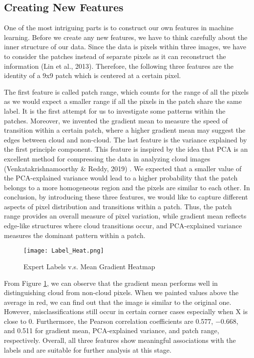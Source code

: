 \documentclass[10pt,letterpaper]{article}
\begin{document}
\subsection{Creating New Features}

One of the most intriguing parts is to construct our own features in machine learning. Before we create any new features, we have to think carefully about the inner structure of our data. Since the data is pixels within three images, we have to consider the patches instead of separate pixels as it can reconstruct the information \cite{lin2013patch} (Lin et al., 2013). Therefore, the following three features are the identity of a 9x9 patch which is centered at a certain pixel. 

The first feature is called patch range, which counts for the range of all the pixels as we would expect a smaller range if all the pixels in the patch share the same label. It is the first attempt for us to investigate some patterns within the patches. Moreover, we invented the gradient mean to measure the speed of transition within a certain patch, where a higher gradient mean may suggest the edges between cloud and non-cloud. The last feature is the variance explained by the first principle component. This feature is inspired by the idea that PCA is an excellent method for compressing the data in analyzing cloud images \cite{venkatakrishnamoorthy2019cloud} (Venkatakrishnamoorthy \& Reddy, 2019) . We expected that a smaller value of the PCA-explained variance would lead to a higher probability that the patch belongs to a more homogeneous region and the pixels are similar to each other. In conclusion, by introducing these three features, we would like to capture different aspects of pixel distribution and transitions within a patch. Thus, the patch range provides an overall measure of pixel variation, while gradient mean reflects edge-like structures where cloud transitions occur, and PCA-explained variance measures the dominant pattern within a patch.


\begin{figure}[htbp]
    \centering
    \texttt{[image: Label\_Heat.png]}
    \caption{Expert Labels v.s. Mean Gradient Heatmap}
    \label{fig:label_heat}
\end{figure}

From Figure \ref{fig:label_heat}, we can observe that the gradient mean performs well in distinguishing cloud from non-cloud pixels. When we painted values above the average in red, we can find out that the image is similar to the original one. However, misclassifications still occur in certain corner cases especially when X is close to 0. Furthermore, the Pearson correlation coefficients are 0.577, $-0.668$, and 0.511 for gradient mean, PCA-explained variance, and patch range, respectively. Overall, all three features show meaningful associations with the labels and are suitable for further analysis at this stage.
\end{document}
